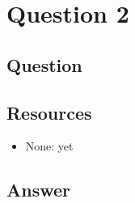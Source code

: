\section{Question 2}

\subsection{Question}


\subsection{Resources}
\begin{itemize}
\item None: yet
\end{itemize}

\subsection{Answer}
